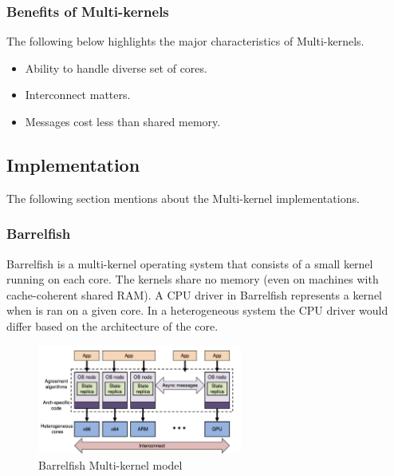 \subsubsection{Benefits of Multi-kernels}
The following below highlights the major characteristics
of Multi-kernels. 

\begin{itemize}
  \item Ability to handle diverse set of cores.
  \item Interconnect matters. 
  \item Messages cost less than shared memory.
\end{itemize}

\subsection{Implementation}
The following section mentions about the Multi-kernel
implementations. 

\subsubsection{Barrelfish}
Barrelfish\cite{multi_kernel_first_paper} is a multi-kernel operating system that consists of a small kernel 
running on each core. The kernels share no memory (even on 
machines with cache-coherent shared RAM). A CPU 
driver in Barrelfish represents a kernel when is ran 
on a given core. In a heterogeneous system the CPU 
driver would differ based on the architecture
of the core. 

\begin{figure}[htbp!] 
  \centering    
  \includegraphics[width=0.6\textwidth]{Multi-kernel}
  \caption[Multi-kernel]{Barrelfish Multi-kernel model \cite{multi_kernel_first_paper}}
  \label{fig:Barrelfish}
  \end{figure}

